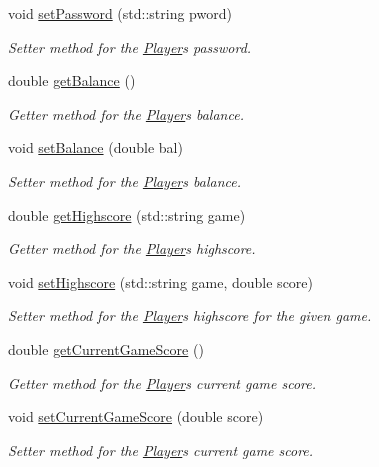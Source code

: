 \begin{DoxyCompactItemize}
void \hyperlink{classPlayer_afff83ec36cc74b248cf1a723ab0c2b6a}{set\+Password} (std\+::string pword)
\begin{DoxyCompactList}\small\item\em Setter method for the \hyperlink{classPlayer}{Player}\textquotesingle{}s password. \end{DoxyCompactList}\item 
double \hyperlink{classPlayer_a0e9f70886f4a7544422931103e59ea26}{get\+Balance} ()
\begin{DoxyCompactList}\small\item\em Getter method for the \hyperlink{classPlayer}{Player}\textquotesingle{}s balance. \end{DoxyCompactList}\item 
void \hyperlink{classPlayer_a7bdcb72d5d22f6f7c1dfa48d960b6d73}{set\+Balance} (double bal)
\begin{DoxyCompactList}\small\item\em Setter method for the \hyperlink{classPlayer}{Player}\textquotesingle{}s balance. \end{DoxyCompactList}\item 
double \hyperlink{classPlayer_a42286b7c54da75f7b64200796f149d4c}{get\+Highscore} (std\+::string game)
\begin{DoxyCompactList}\small\item\em Getter method for the \hyperlink{classPlayer}{Player}\textquotesingle{}s highscore. \end{DoxyCompactList}\item 
void \hyperlink{classPlayer_ae77a5ec07cea02f94c7c8bc9830e2521}{set\+Highscore} (std\+::string game, double score)
\begin{DoxyCompactList}\small\item\em Setter method for the \hyperlink{classPlayer}{Player}\textquotesingle{}s highscore for the given game. \end{DoxyCompactList}\item 
double \hyperlink{classPlayer_a0aade73735727e68e4f07734e76c875a}{get\+Current\+Game\+Score} ()
\begin{DoxyCompactList}\small\item\em Getter method for the \hyperlink{classPlayer}{Player}\textquotesingle{}s current game score. \end{DoxyCompactList}\item 
void \hyperlink{classPlayer_a1b2af56d4beb6e7a7961b3b572b42bdb}{set\+Current\+Game\+Score} (double score)
\begin{DoxyCompactList}\small\item\em Setter method for the \hyperlink{classPlayer}{Player}\textquotesingle{}s current game score. \end{DoxyCompactList}\item 

\end{DoxyCompactItemize}
